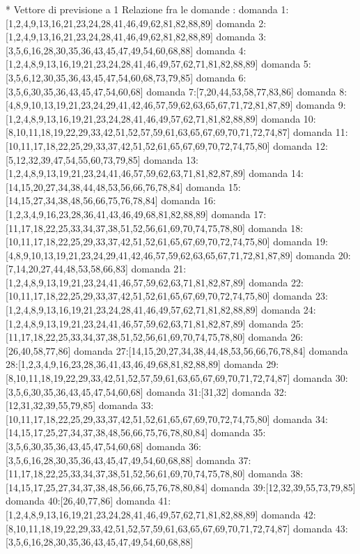 * Vettore di previsione a 1
Relazione fra le domande :
domanda 1:[1,2,4,9,13,16,21,23,24,28,41,46,49,62,81,82,88,89]
domanda 2:[1,2,4,9,13,16,21,23,24,28,41,46,49,62,81,82,88,89]
domanda 3:[3,5,6,16,28,30,35,36,43,45,47,49,54,60,68,88]
domanda 4:[1,2,4,8,9,13,16,19,21,23,24,28,41,46,49,57,62,71,81,82,88,89]
domanda 5:[3,5,6,12,30,35,36,43,45,47,54,60,68,73,79,85]
domanda 6:[3,5,6,30,35,36,43,45,47,54,60,68]
domanda 7:[7,20,44,53,58,77,83,86]
domanda 8:[4,8,9,10,13,19,21,23,24,29,41,42,46,57,59,62,63,65,67,71,72,81,87,89]
domanda 9:[1,2,4,8,9,13,16,19,21,23,24,28,41,46,49,57,62,71,81,82,88,89]
domanda 10:[8,10,11,18,19,22,29,33,42,51,52,57,59,61,63,65,67,69,70,71,72,74,87]
domanda 11:[10,11,17,18,22,25,29,33,37,42,51,52,61,65,67,69,70,72,74,75,80]
domanda 12:[5,12,32,39,47,54,55,60,73,79,85]
domanda 13:[1,2,4,8,9,13,19,21,23,24,41,46,57,59,62,63,71,81,82,87,89]
domanda 14:[14,15,20,27,34,38,44,48,53,56,66,76,78,84]
domanda 15:[14,15,27,34,38,48,56,66,75,76,78,84]
domanda 16:[1,2,3,4,9,16,23,28,36,41,43,46,49,68,81,82,88,89]
domanda 17:[11,17,18,22,25,33,34,37,38,51,52,56,61,69,70,74,75,78,80]
domanda 18:[10,11,17,18,22,25,29,33,37,42,51,52,61,65,67,69,70,72,74,75,80]
domanda 19:[4,8,9,10,13,19,21,23,24,29,41,42,46,57,59,62,63,65,67,71,72,81,87,89]
domanda 20:[7,14,20,27,44,48,53,58,66,83]
domanda 21:[1,2,4,8,9,13,19,21,23,24,41,46,57,59,62,63,71,81,82,87,89]
domanda 22:[10,11,17,18,22,25,29,33,37,42,51,52,61,65,67,69,70,72,74,75,80]
domanda 23:[1,2,4,8,9,13,16,19,21,23,24,28,41,46,49,57,62,71,81,82,88,89]
domanda 24:[1,2,4,8,9,13,19,21,23,24,41,46,57,59,62,63,71,81,82,87,89]
domanda 25:[11,17,18,22,25,33,34,37,38,51,52,56,61,69,70,74,75,78,80]
domanda 26:[26,40,58,77,86]
domanda 27:[14,15,20,27,34,38,44,48,53,56,66,76,78,84]
domanda 28:[1,2,3,4,9,16,23,28,36,41,43,46,49,68,81,82,88,89]
domanda 29:[8,10,11,18,19,22,29,33,42,51,52,57,59,61,63,65,67,69,70,71,72,74,87]
domanda 30:[3,5,6,30,35,36,43,45,47,54,60,68]
domanda 31:[31,32]
domanda 32:[12,31,32,39,55,79,85]
domanda 33:[10,11,17,18,22,25,29,33,37,42,51,52,61,65,67,69,70,72,74,75,80]
domanda 34:[14,15,17,25,27,34,37,38,48,56,66,75,76,78,80,84]
domanda 35:[3,5,6,30,35,36,43,45,47,54,60,68]
domanda 36:[3,5,6,16,28,30,35,36,43,45,47,49,54,60,68,88]
domanda 37:[11,17,18,22,25,33,34,37,38,51,52,56,61,69,70,74,75,78,80]
domanda 38:[14,15,17,25,27,34,37,38,48,56,66,75,76,78,80,84]
domanda 39:[12,32,39,55,73,79,85]
domanda 40:[26,40,77,86]
domanda 41:[1,2,4,8,9,13,16,19,21,23,24,28,41,46,49,57,62,71,81,82,88,89]
domanda 42:[8,10,11,18,19,22,29,33,42,51,52,57,59,61,63,65,67,69,70,71,72,74,87]
domanda 43:[3,5,6,16,28,30,35,36,43,45,47,49,54,60,68,88]
